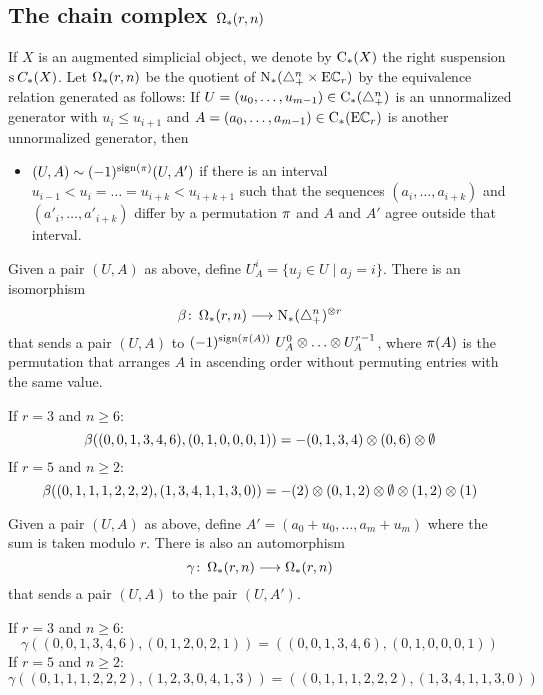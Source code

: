 \subsection{The chain complex \texorpdfstring{$\operatorname{\Omega}_{*}(r,n)$}{Omega(r,n)}} If $X$ is an augmented simplicial object, we denote by $\operatorname{C}_{*}(X)$ the right suspension $\operatorname{s}^{}C_{*}(X)$. Let $\operatorname{\Omega}_{*}(r,n)$ be the quotient of $\operatorname{N}_{*}(\triangle_{+}^{n}\times \mathrm{E}\mathbb{C}_r)$ by the equivalence relation generated as follows: If $U = (u_0,\dots,u_{m-1})\in \operatorname{C}_{*}(\triangle_{+}^n)$ is an unnormalized generator with $u_i\leq u_{i+1}$ and $A = (a_0,\dots,a_{m-1})\in \operatorname{C}_{*}(\mathrm{E}\mathbb{C}_r)$ is another unnormalized generator, then
\begin{itemize}
	\item $(U,A)\sim (-1)^{\operatorname{sign}(\pi)}(U,A')$ if there is an interval $u_{i-1}<u_i =\dots =u_{i+k}<u_{i+k+1}$ such that the sequences $(a_i,\dots,a_{i+k})$ and $(a'_i,\dots,a'_{i+k})$ differ by a permutation $\pi$ and $A$ and $A'$ agree outside that interval.
\end{itemize}

Given a pair $(U,A)$ as above, define $U_A^i = \{u_j\in U\mid a_j=i\}$. There is an isomorphism
\[
	\beta \colon \operatorname{\Omega}_{*}(r,n) \longrightarrow \operatorname{N}_{*}(\triangle_{+}^n)^{\otimes r}
\]
that sends a pair $(U,A)$ to $(-1)^{\sign{\perm(A)}}\ U_A^0 \ot \dots \ot U_A^{r-1}$, where $\pi(A)$ is the permutation that arranges $A$ in ascending order without permuting entries with the same value.
\begin{example}\label{example:beta} If $r=3$ and $n \geq 6$:
\[
		\beta((0,0,1,3,4,6),(0,1,0,0,0,1)) = -(0,1,3,4) \otimes (0,6) \otimes \emptyset
	\]
If $r=5$ and $n \geq 2$:
	\[
		\beta((0,1,1,1,2,2,2),(1,3,4,1,1,3,0)) = -(2) \otimes (0,1,2) \otimes \emptyset \otimes (1,2) \otimes (1)
	\]
	\end{example}



Given a pair $(U,A)$ as above, define $A' = (a_0+u_0,\dots,a_m+u_m)$ where the sum is taken modulo $r$. There is also an automorphism
\[
	\gamma \colon \operatorname{\Omega}_{*}(r,n) \longrightarrow \operatorname{\Omega}_{*}(r,n)
\]
that sends a pair $(U,A)$ to the pair $(U,A')$.
	\begin{example}\label{example:gamma} If $r=3$ and $n \geq 6$:
	\[
		\gamma((0,0,1,3,4,6),(0,1,2,0,2,1)) = ((0,0,1,3,4,6),(0,1,0,0,0,1))
	\]
If $r=5$ and $n \geq 2$:
	\[
		\gamma((0,1,1,1,2,2,2),(1,2,3,0,4,1,3)) = ((0,1,1,1,2,2,2),(1,3,4,1,1,3,0))
		\]
\end{example}

